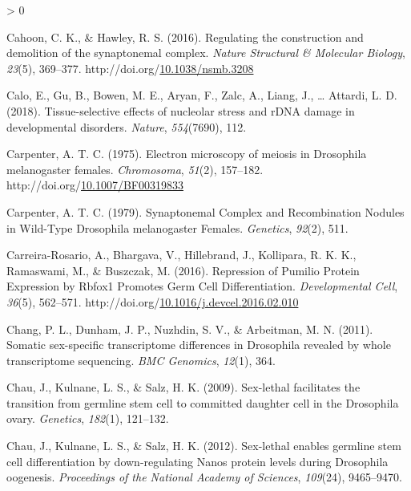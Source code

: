 \documentclass[12pt,oneside]{reedthesis}
\newlength{\cslhangindent}
\newenvironment{CSLReferences}[2] %
 {%
  \setlength{\parindent}{0pt}
  \ifodd #1 \everypar{\setlength{\hangindent}{\cslhangindent}}\ignorespaces\fi
  \ifnum #2 > 0
  \setlength{\parskip}{#2\baselineskip}
  \fi
 }%
 {}
\begin{document}
\begin{CSLReferences}{1}{0}
\leavevmode\hypertarget{ref-cahoonRegulatingConstructionDemolition2016}{}%
Cahoon, C. K., \& Hawley, R. S. (2016). Regulating the construction and demolition of the synaptonemal complex. \emph{Nature Structural \& Molecular Biology}, \emph{23}(5), 369--377. http://doi.org/\href{https://doi.org/10.1038/nsmb.3208}{10.1038/nsmb.3208}

\leavevmode\hypertarget{ref-Calo2018a}{}%
Calo, E., Gu, B., Bowen, M. E., Aryan, F., Zalc, A., Liang, J., \ldots{} Attardi, L. D. (2018). Tissue-selective effects of nucleolar stress and {rDNA} damage in developmental disorders. \emph{Nature}, \emph{554}(7690), 112.

\leavevmode\hypertarget{ref-carpenterElectronMicroscopyMeiosis1975}{}%
Carpenter, A. T. C. (1975). Electron microscopy of meiosis in {Drosophila} melanogaster females. \emph{Chromosoma}, \emph{51}(2), 157--182. http://doi.org/\href{https://doi.org/10.1007/BF00319833}{10.1007/BF00319833}

\leavevmode\hypertarget{ref-carpenterSynaptonemalComplexRecombination1979}{}%
Carpenter, A. T. C. (1979). Synaptonemal {Complex} and {Recombination Nodules} in {Wild-Type Drosophila} melanogaster {Females}. \emph{Genetics}, \emph{92}(2), 511.

\leavevmode\hypertarget{ref-Carreira-Rosario2016e}{}%
Carreira-Rosario, A., Bhargava, V., Hillebrand, J., Kollipara, R. K. K., Ramaswami, M., \& Buszczak, M. (2016). Repression of {Pumilio Protein Expression} by {Rbfox1 Promotes Germ Cell Differentiation}. \emph{Developmental Cell}, \emph{36}(5), 562--571. http://doi.org/\href{https://doi.org/10.1016/j.devcel.2016.02.010}{10.1016/j.devcel.2016.02.010}

\leavevmode\hypertarget{ref-Chang2011}{}%
Chang, P. L., Dunham, J. P., Nuzhdin, S. V., \& Arbeitman, M. N. (2011). Somatic sex-specific transcriptome differences in {Drosophila} revealed by whole transcriptome sequencing. \emph{BMC Genomics}, \emph{12}(1), 364.

\leavevmode\hypertarget{ref-Chau2009}{}%
Chau, J., Kulnane, L. S., \& Salz, H. K. (2009). Sex-lethal facilitates the transition from germline stem cell to committed daughter cell in the {Drosophila} ovary. \emph{Genetics}, \emph{182}(1), 121--132.

\leavevmode\hypertarget{ref-Chau2012}{}%
Chau, J., Kulnane, L. S., \& Salz, H. K. (2012). Sex-lethal enables germline stem cell differentiation by down-regulating {Nanos} protein levels during {Drosophila} oogenesis. \emph{Proceedings of the National Academy of Sciences}, \emph{109}(24), 9465--9470.


\end{CSLReferences}
\end{document}
